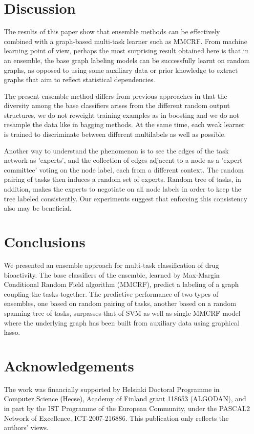 \documentclass[runningheads,a4paper]{llncs}
\begin{document}
\section{Discussion}

The results of this paper show that ensemble methods can be effectively combined with a graph-based multi-task learner such as MMCRF.
From machine learning point of view, perhaps the most surprising result obtained here is that in an ensemble, the base graph labeling models can be successfully learnt  
on random graphs, as opposed to using some auxiliary data or prior knowledge to extract graphs that aim to reflect statistical dependencies.

The present ensemble method differs from previous approaches in that the diversity among the base classifiers arises from the different random output structures,
 we do not reweight training examples as in boosting and we do not resample the data like in bagging methods. At the same time, each weak learner is trained to discriminate between different multilabels as well as possible.  
 
Another way to understand the phenomenon is to see the edges of the task network as 'experts', and the collection of edges adjacent to a node as a 'expert committee' voting on the node label, each from a different context. The random pairing of tasks then induces a random set of experts. Random tree of tasks, in addition, makes the experts to negotiate on all node labels in order to keep the tree labeled consistently. Our experiments suggest that enforcing this consistency also may be beneficial.


\section{Conclusions}

We presented an ensemble approach for multi-task classification of drug bioactivity. The base classifiers of the ensemble, learned by Max-Margin Conditional Random Field algorithm (MMCRF),  predict a labeling of a graph coupling the tasks together. The predictive performance of two types of ensembles, one based on random pairing
of tasks, another based on a random spanning tree of tasks, surpasses that of SVM as well as single MMCRF model where the underlying graph has been built from auxiliary data using graphical lasso.



\section*{Acknowledgements} The work was financially supported by Helsinki Doctoral Programme in Computer Science (Hecse), Academy of Finland grant 118653 
(ALGODAN), and in part by the IST Programme of the 
European Community, under the PASCAL2 Network 
of Excellence, ICT-2007-216886. This publication only reflects 
the authors' views.



\end{document}
